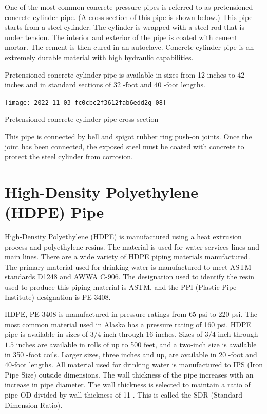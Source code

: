 \documentclass[10pt]{article}
\begin{document}
One of the most common concrete pressure pipes is referred to as pretensioned concrete cylinder pipe. (A cross-section of this pipe is shown below.) This pipe starts from a steel cylinder. The cylinder is wrapped with a steel rod that is under tension. The interior and exterior of the pipe is coated with cement mortar. The cement is then cured in an autoclave. Concrete cylinder pipe is an extremely durable material with high hydraulic capabilities.

Pretensioned concrete cylinder pipe is available in sizes from 12 inches to 42 inches and in standard sections of 32 -foot and 40 -foot lengths.

\texttt{[image: 2022\_11\_03\_fc0cbc2f3612fab6edd2g-08]}

Pretensioned concrete cylinder pipe cross section

This pipe is connected by bell and spigot rubber ring push-on joints. Once the joint has been connected, the exposed steel must be coated with concrete to protect the steel cylinder from corrosion.

\section{High-Density Polyethylene (HDPE) Pipe}
High-Density Polyethylene (HDPE) is manufactured using a heat extrusion process and polyethylene resins. The material is used for water services lines and main lines. There are a wide variety of HDPE piping materials manufactured. The primary material used for drinking water is manufactured to meet ASTM standards D1248 and AWWA C-906. The designation used to identify the resin used to produce this piping material is ASTM, and the PPI (Plastic Pipe Institute) designation is PE 3408.

HDPE, PE 3408 is manufactured in pressure ratings from 65 psi to 220 psi. The most common material used in Alaska has a pressure rating of 160 psi. HDPE pipe is available in sizes of $3 / 4$ inch through 16 inches. Sizes of $3 / 4$ inch through $1.5$ inches are available in rolls of up to 500 feet, and a two-inch size is available in 350 -foot coils. Larger sizes, three inches and up, are available in 20 -foot and 40-foot lengths. All material used for drinking water is manufactured to IPS (Iron Pipe Size) outside dimensions. The wall thickness of the pipe increases with an increase in pipe diameter. The wall thickness is selected to maintain a ratio of pipe OD divided by wall thickness of 11 . This is called the SDR (Standard Dimension Ratio).\\
\end{document}
